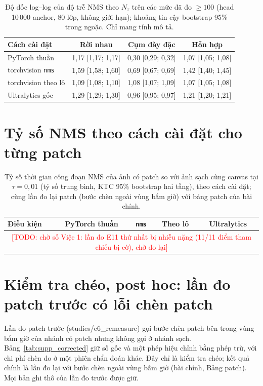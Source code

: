 \documentclass[11pt,a4paper]{article}
\newcommand{\Ntau}{N_{\tau}}
\newcommand{\todo}[1]{\textcolor{red}{[TODO: #1]}}
\begin{document}
\begin{table}[t]
\centering\small
\caption{Độ dốc log--log của độ trễ NMS theo $\Ntau$ trên các mức đã đo $\ge 100$ (head 10\,000 anchor, 80 lớp, không giới hạn); khoảng tin cậy bootstrap 95\% trong ngoặc. Chỉ mang tính mô tả.}
\label{tab:slopes}
\begin{tabular}{@{}lccc@{}}
\toprule
Cách cài đặt & Rời nhau & Cụm dày đặc & Hỗn hợp \\
\midrule
PyTorch thuần & 1,17 [1,17; 1,17] & 0,30 [0,29; 0,32] & 1,07 [1,05; 1,08] \\
torchvision \texttt{nms} & 1,59 [1,58; 1,60] & 0,69 [0,67; 0,69] & 1,42 [1,40; 1,45] \\
torchvision theo lô & 1,09 [1,08; 1,10] & 1,08 [1,07; 1,09] & 1,07 [1,05; 1,08] \\
Ultralytics gốc & 1,29 [1,29; 1,30] & 0,96 [0,95; 0,97] & 1,21 [1,20; 1,21] \\
\bottomrule
\end{tabular}
\end{table}

\section{Tỷ số NMS theo cách cài đặt cho từng patch}
\begin{table}[t]
\centering\small
\caption{Tỷ số thời gian công đoạn NMS của ảnh có patch so với ảnh sạch cùng canvas tại $\tau=0{,}01$ (tỷ số trung bình, KTC 95\% bootstrap hai tầng), theo cách cài đặt; cùng lần đo lại patch (bước chèn ngoài vùng bấm giờ) với bảng patch của bài chính.}
\label{tab:impl}
\begin{tabular}{@{}lcccc@{}}
\toprule
Điều kiện & PyTorch thuần & \texttt{nms} & Theo lô & Ultralytics \\
\midrule
\multicolumn{5}{c}{\todo{chờ số Việc 1: lần đo E11 thứ nhất bị nhiễu nặng (11/11 điểm tham chiếu bị cờ), chờ đo lại}} \\
\bottomrule
\end{tabular}
\end{table}

\section{Kiểm tra chéo, post hoc: lần đo patch trước có lỗi chèn patch}
Lần đo patch trước (studies/e6\_remeasure) gọi bước chèn patch bên trong vùng bấm giờ của nhánh có patch nhưng không gọi ở nhánh sạch. Bảng~\ref{tab:supp_corrected} giữ số gốc và một phép hiệu chỉnh bằng phép trừ, với chi phí chèn đo ở một phiên chẩn đoán khác. Đây chỉ là kiểm tra chéo; kết quả chính là lần đo lại với bước chèn ngoài vùng bấm giờ (bài chính, Bảng patch). Mọi bản ghi thô của lần đo trước được giữ.
\end{document}
